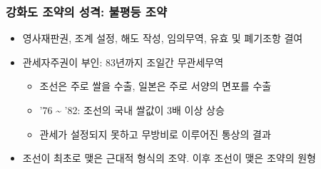 \subsubsection*{강화도 조약의 성격: 불평등 조약}
\begin{itemize}
    \item 영사재판권, 조계 설정, 해도 작성, 임의무역, 유효 및 폐기조항 결여
    \item 관세자주권이 부인: 83년까지 조일간 무관세무역
    \begin{itemize}
        \item 조선은 주로 쌀을 수출, 일본은 주로 서양의 면포를 수출
        \item '76 \textasciitilde{} '82: 조선의 국내 쌀값이 3배 이상 상승
        \item 관세가 설정되지 못하고 무방비로 이루어진 통상의 결과
    \end{itemize}
    \item 조선이 최초로 맺은 근대적 형식의 조약. 이후 조선이 맺은 조약의 원형
\end{itemize}

